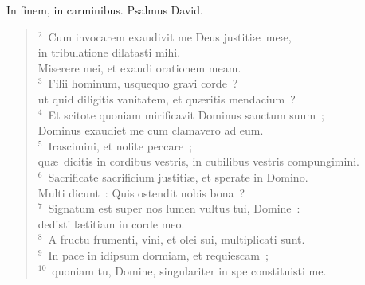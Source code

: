 \bchapter
\lettrine[lines=3,image=true,loversize=0.05,lraise=-0.03]{I}{}n finem, in carminibus. Psalmus David.
\begin{flushleft}\begin{verse}\vspace{6pt}${}^{2}$~Cum invocarem exaudivit me Deus justiti\ae\ me\ae ,\\ in tribulatione dilatasti mihi.\\ Miserere mei, et exaudi orationem meam.\\
${}^{3}$~Filii hominum, usquequo gravi corde~?\\ ut quid diligitis vanitatem, et qu\ae ritis mendacium~?\\
${}^{4}$~Et scitote quoniam mirificavit Dominus sanctum suum~;\\ Dominus exaudiet me cum clamavero ad eum.\\
${}^{5}$~Irascimini, et nolite peccare~;\\ qu\ae\ dicitis in cordibus vestris, in cubilibus vestris compungimini.\\
${}^{6}$~Sacrificate sacrificium justiti\ae , et sperate in Domino.\\ Multi dicunt~: Quis ostendit nobis bona~?\\
${}^{7}$~Signatum est super nos lumen vultus tui, Domine~:\\ dedisti l\ae titiam in corde meo.\\
${}^{8}$~A fructu frumenti, vini, et olei sui, multiplicati sunt.\\
${}^{9}$~In pace in idipsum dormiam, et requiescam~;\\
${}^{10}$~quoniam tu, Domine, singulariter in spe constituisti me.\end{verse}\end{flushleft}



